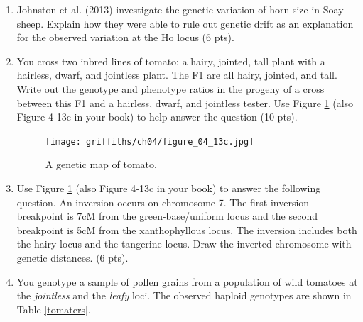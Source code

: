 \documentclass[]{article}
\begin{document}
\begin{enumerate}
\newpage
\item Johnston et al. (2013) investigate the genetic variation of horn size in Soay sheep. Explain how they were able to rule out genetic drift as an explanation for the observed variation at the Ho locus (6 pts).

\newpage
\item You cross two inbred lines of tomato: a hairy, jointed, tall plant with a hairless, dwarf, and jointless plant.  The F1 are all hairy, jointed, and tall.  Write out the genotype and phenotype ratios in the progeny of a cross between this F1 and a hairless, dwarf, and jointless tester.  Use Figure \ref{map} (also Figure 4-13c in your book) to help answer the question (10 pts).

\begin{figure}[h]
  \begin{center}
   \texttt{[image: griffiths/ch04/figure\_04\_13c.jpg]}
    \caption{A genetic map of tomato. } 
\label{map}
  \end{center}
\end{figure}


\newpage
\item Use Figure \ref{map} (also Figure 4-13c in your book) to answer the following question. An inversion occurs on chromosome 7.  The first inversion breakpoint is 7cM from the green-base/uniform locus and the second breakpoint is 5cM from the xanthophyllous locus. The inversion includes both the hairy locus and the tangerine locus. Draw the inverted chromosome with genetic distances. (6 pts).


\newpage
\item You genotype a sample of pollen grains from a population of wild tomatoes at the \emph{jointless} and the \emph{leafy} loci. The observed haploid genotypes are shown in Table \ref{tomaters}. 


\end{enumerate}
\end{document}
